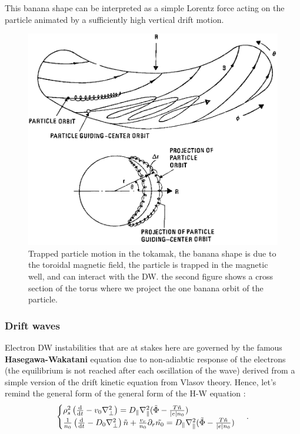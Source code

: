 \documentclass[11pt,a4paper]{report}
\begin{document}
\begin{multicols}{2}
    This banana shape can be interpreted as a simple Lorentz force acting on the particle animated by a sufficiently high vertical drift motion.
    \begin{figure}[H]
        \centering
        \includegraphics[width=1\linewidth]{./figures/banana.png}
        \caption{Trapped particle motion in the tokamak, the banana shape is due to the toroidal magnetic field, the particle is trapped in the magnetic well, and can interact with the DW. the second figure shows a cross section of the torus where we project the one banana orbit of the particle.}
        \label{}
    \end{figure}

    \subsubsection{Drift waves}
    Electron DW instabilities that are at stakes here are governed by the famous \textbf{Hasegawa-Wakatani} equation due to non-adiabtic response of the electrons (the equilibrium is not reached after each oscillation of the wave) derived from a simple version of the drift kinetic equation from Vlasov theory. Hence, let's remind the general form of the general form of the H-W equation :
    \begin{equation}
        \begin{cases}
            \rho_s^2 \left(
            \dv{t} - v_0\nabla_\perp^2 \right) = D_\parallel\nabla_\parallel^2(\tilde{\Phi} - \frac{T\tilde{n}}{|e|n_0}) \\
            \frac{1}{n_0}\left(\dv{t} - D_0\nabla_\perp^2\right)\tilde{n} + \frac{v_r}{n_0}\partial_r\tilde{n_0} = D_\parallel\nabla_\parallel^2(\tilde{\Phi} - \frac{T\tilde{n}}{|e|n_0})
        \end{cases}\,.
    \end{equation}

\end{multicols}
\end{document}
